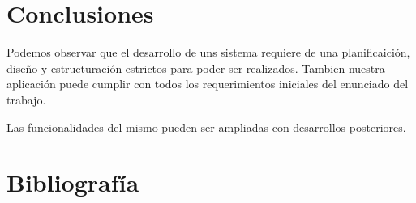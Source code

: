 \documentclass[12pt]{article}
\begin{document}
\section{Conclusiones}
Podemos observar que el desarrollo de uns sistema requiere de una planificaición, diseño y estructuración estrictos para poder ser realizados.   Tambien nuestra aplicación puede cumplir con todos los requerimientos iniciales del enunciado del trabajo.  

Las funcionalidades del mismo pueden ser ampliadas con desarrollos posteriores.  
\nocite{*}

\newpage
\section{Bibliografía}



  
\end{document}
